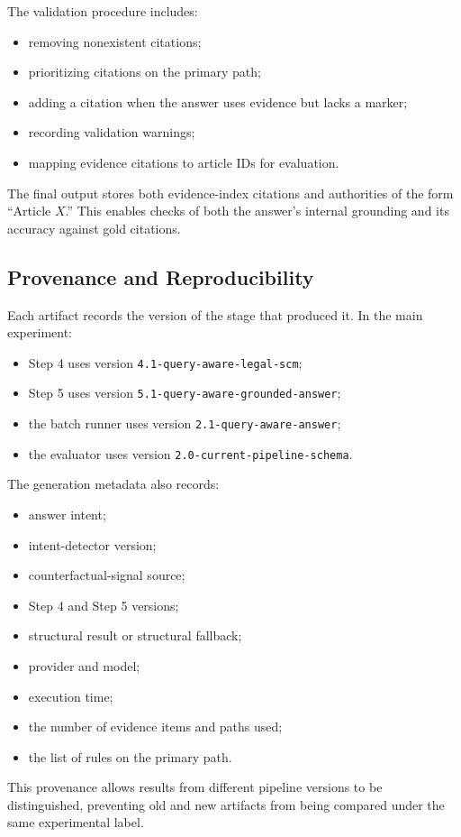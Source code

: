 The validation procedure includes:

\begin{itemize}
    \item removing nonexistent citations;
    \item prioritizing citations on the primary path;
    \item adding a citation when the answer uses evidence but lacks a marker;
    \item recording validation warnings;
    \item mapping evidence citations to article IDs for evaluation.
\end{itemize}

The final output stores both evidence-index citations and authorities of the
form ``Article \(X\).'' This enables checks of both the answer's internal
grounding and its accuracy against gold citations.

\subsection{Provenance and Reproducibility}

Each artifact records the version of the stage that produced it. In the main
experiment:

\begin{itemize}
    \item Step 4 uses version
    \texttt{4.1-query-aware-legal-scm};

    \item Step 5 uses version
    \texttt{5.1-query-aware-grounded-answer};

    \item the batch runner uses version
    \texttt{2.1-query-aware-answer};

    \item the evaluator uses version
    \texttt{2.0-current-pipeline-schema}.
\end{itemize}

The generation metadata also records:

\begin{itemize}
    \item answer intent;
    \item intent-detector version;
    \item counterfactual-signal source;
    \item Step 4 and Step 5 versions;
    \item structural result or structural fallback;
    \item provider and model;
    \item execution time;
    \item the number of evidence items and paths used;
    \item the list of rules on the primary path.
\end{itemize}

This provenance allows results from different pipeline versions to be
distinguished, preventing old and new artifacts from being compared under
the same experimental label.
